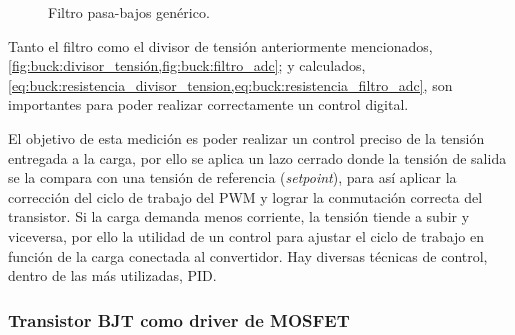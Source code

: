 \begin{figure}[H]
    \centering
    \caption{Filtro pasa-bajos genérico.}
    \label{fig:buck:filtro_adc}
\end{figure}

Tanto el filtro como el divisor de tensión anteriormente mencionados, \cref{fig:buck:divisor_tensión,fig:buck:filtro_adc}; y calculados, \cref{eq:buck:resistencia_divisor_tension,eq:buck:resistencia_filtro_adc}, son importantes para poder realizar correctamente un control digital.

El objetivo de esta medición es poder realizar un control preciso de la tensión entregada a la carga, por ello se aplica un lazo cerrado donde la tensión de salida se la compara con una tensión de referencia (\textit{setpoint}), para así aplicar la corrección del ciclo de trabajo del PWM y lograr la conmutación correcta del transistor. Si la carga demanda menos corriente, la tensión tiende a subir y viceversa, por ello la utilidad de un control para ajustar el ciclo de trabajo en función de la carga conectada al convertidor. Hay diversas técnicas de control, dentro de las más utilizadas, PID.

\subsubsection{Transistor BJT como driver de MOSFET}

